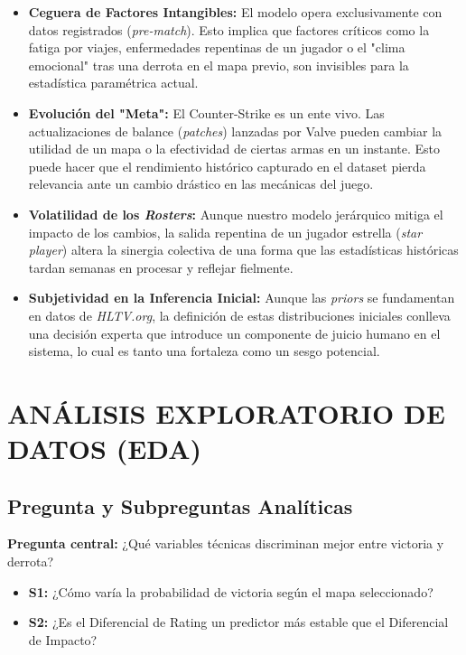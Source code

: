 \documentclass[twocolumn,10pt]{article}
\begin{document}
\begin{itemize}
    \item \textbf{Ceguera de Factores Intangibles:} El modelo opera exclusivamente con datos registrados (\textit{pre-match}). Esto implica que factores críticos como la fatiga por viajes, enfermedades repentinas de un jugador o el "clima emocional" tras una derrota en el mapa previo, son invisibles para la estadística paramétrica actual.
    \item \textbf{Evolución del "Meta":} El Counter-Strike es un ente vivo. Las actualizaciones de balance (\textit{patches}) lanzadas por Valve pueden cambiar la utilidad de un mapa o la efectividad de ciertas armas en un instante. Esto puede hacer que el rendimiento histórico capturado en el dataset pierda relevancia ante un cambio drástico en las mecánicas del juego.
    \item \textbf{Volatilidad de los \textit{Rosters}:} Aunque nuestro modelo jerárquico mitiga el impacto de los cambios, la salida repentina de un jugador estrella (\textit{star player}) altera la sinergia colectiva de una forma que las estadísticas históricas tardan semanas en procesar y reflejar fielmente.
    \item \textbf{Subjetividad en la Inferencia Inicial:} Aunque las \textit{priors} se fundamentan en datos de \textit{HLTV.org}, la definición de estas distribuciones iniciales conlleva una decisión experta que introduce un componente de juicio humano en el sistema, lo cual es tanto una fortaleza como un sesgo potencial.
\end{itemize}

\section{ANÁLISIS EXPLORATORIO DE DATOS (EDA)}

\subsection{Pregunta y Subpreguntas Analíticas}
\textbf{Pregunta central:} ¿Qué variables técnicas discriminan mejor entre victoria y derrota?
\begin{itemize}
    \item \textbf{S1:} ¿Cómo varía la probabilidad de victoria según el mapa seleccionado?
    \item \textbf{S2:} ¿Es el Diferencial de Rating un predictor más estable que el Diferencial de Impacto?
\end{itemize}
\end{document}

